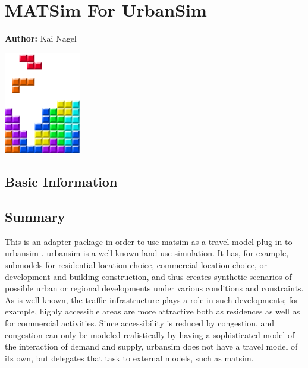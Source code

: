 \chapter{MATSim For UrbanSim}
\label{ch:matsim4urbansim}

\hfill \textbf{Author:} Kai Nagel

\begin{center} \includegraphics[width=0.25\textwidth, angle=0]{figures/MATSimBook.png} \end{center}

\section{Basic Information}
\label{sec:matsim4urbansim-stdInfo}


\section{Summary}


This is an adapter package in order to use \gls{matsim} as a travel model plug-in to \acrshort{urbansim} \citep[e.g.][see \url{http://www.urbansim.org}]{WaddellEtc2003UrbanSim}.
%
\acrshort{urbansim} is a well-known land use simulation.  It has, for example, submodels for residential location choice, commercial location choice, or development and building construction, and thus creates synthetic scenarios of possible urban or regional developments under various conditions and constraints.  As is well known, the traffic infrastructure plays a role in such developments; for example, highly accessible areas are more attractive both as residences as well as for commercial activities.  Since accessibility is reduced by congestion, and congestion can only be modeled realistically by having a sophisticated model of the interaction of demand and supply, \acrshort{urbansim} does not have a travel model of its own, but delegates that task to external models, such as \gls{matsim}.


